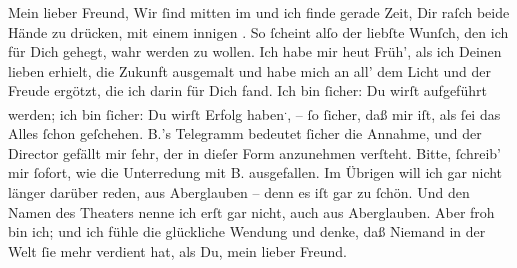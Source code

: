 \pstart\center{}Mein lieber Freund,\pend\vspace{0.5em}
\pstart
           Wir{ }ſind mitten im \label{K_L02618-1v}\label{K_L02618-1} und ich finde gerade Zeit, Dir
               raſch beide Hände zu drücken, mit einem innigen \label{K_L02618-2v}\label{K_L02618-2}. So{ }ſcheint alſo der liebſte Wunſch, den ich für Dich gehegt, wahr werden zu
               wollen. Ich habe mir heut{ }Früh’, als ich Deinen lieben \label{K_L02618-3v}\label{K_L02618-3} erhielt, die Zukunft ausgemalt und habe mich an all’ dem Licht und der Freude
               ergötzt, die ich darin für Dich fand. Ich bin{ }ſicher: Du wirſt {\pb}aufgeführt werden; ich bin{ }ſicher: Du wirſt Erfolg haben\substVorne{}\textsuperscript{.}\substDazwischen{},\substHinten{} –{ }ſo{ }ſicher, daß mir iſt, als{ }ſei das Alles{ }ſchon geſchehen. \textsc{B.}’s Telegramm bedeutet{ }ſicher die Annahme, und der Director gefällt mir{ }ſehr, der in dieſer
               Form anzunehmen verſteht. Bitte,{ }ſchreib’ mir{ }ſofort,  wie die Unterredung mit \textsc{B.} ausgefallen. Im Übrigen will ich gar nicht länger darüber reden, aus
               Aberglauben – denn es iſt gar zu{ }ſchön. Und den Namen des Theaters nenne ich erſt gar nicht, auch aus
               Aberglauben. Aber froh bin ich; und {\pb}ich fühle die
               glückliche Wendung und denke, daß Niemand in der Welt{ }ſie mehr verdient hat, als Du,
               mein lieber Freund.\pend
           
